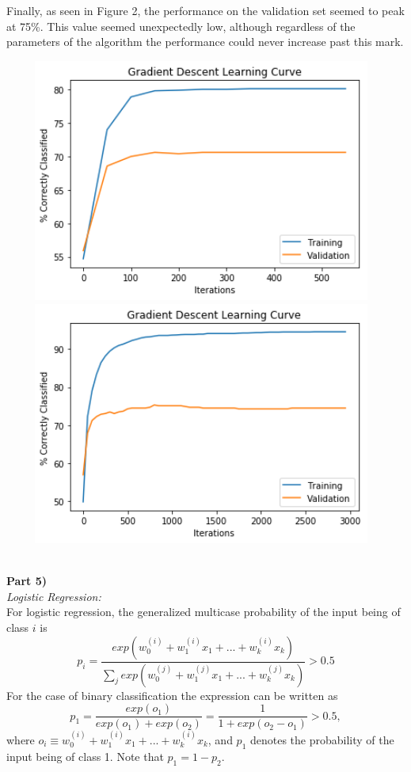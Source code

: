 \documentclass{article}
\begin{document}
Finally, as seen in Figure 2, the performance on the validation set seemed to peak at 75\%. This value seemed unexpectedly low, although regardless of the parameters of the algorithm the performance could never increase past this mark.
\begin{center}
\includegraphics[width=13cm, height=8cm]{latex_images/part4_lambda10.png} 
\includegraphics[width=13cm, height=8cm]{latex_images/part4_learningcurve_withval.png} 
\end{center}
\\
\textbf{Part 5)}\\
\textit{Logistic Regression:}\\
For logistic regression, the generalized multicase probability of the input being of class $i$ is 
$$p_i=\frac{exp(w_0^{(i)}+w_1^{(i)}x_1+...+w_k^{(i)}x_k)}{\sum_jexp(w_0^{(j)}+w_1^{(j)}x_1+...+w_k^{(j)}x_k)}>0.5$$
For the case of binary classification the expression can be written as
$$p_1=\frac{exp(o_1)}{exp(o_1)+exp(o_2)}=\frac{1}{1+exp(o_2-o_1)}>0.5,$$
where $o_i\equiv w_0^{(i)}+w_1^{(i)}x_1+...+w_k^{(i)}x_k$, and $p_1$ denotes the probability of the input being of class 1. Note that $p_1=1-p_2$. \\
\end{document}
